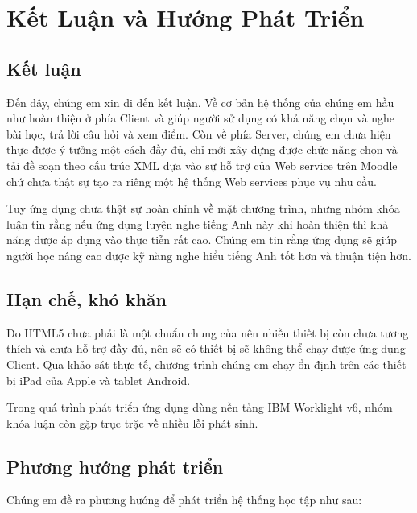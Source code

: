 \def\baselinestretch{1}
\chapter{Kết Luận và Hướng Phát Triển}
\ifpdf
    \graphicspath{{Conclusions/ConclusionsFigs/PNG/}{Conclusions/ConclusionsFigs/PDF/}{Conclusions/ConclusionsFigs/}}
\else
    \graphicspath{{Conclusions/ConclusionsFigs/EPS/}{Conclusions/ConclusionsFigs/}}
\fi

\def\baselinestretch{1.66}
 

\section{Kết luận}

Đến đây, chúng em xin đi đến kết luận. Về cơ bản hệ thống của chúng em hầu như hoàn thiện ở phía Client và giúp người sử dụng có khả năng chọn và nghe bài học, trả lời câu hỏi và xem điểm. Còn về phía Server, chúng em chưa hiện thực được ý tưởng một cách đầy đủ, chỉ mới xây dựng được chức năng chọn và tải đề soạn theo cấu trúc XML dựa vào sự hỗ trợ của Web service trên Moodle chứ chưa thật sự tạo ra riêng một hệ thống Web services phục vụ nhu cầu.

Tuy ứng dụng chưa thật sự hoàn chỉnh về mặt chương trình, nhưng nhóm khóa luận tin rằng nếu ứng dụng luyện nghe tiếng Anh này khi hoàn thiện thì khả năng được áp dụng vào thực tiễn rất cao. Chúng em tin rằng ứng dụng sẽ giúp người học nâng cao được kỹ năng nghe hiểu tiếng Anh tốt hơn và thuận tiện hơn.
 
\section{Hạn chế, khó khăn}

Do HTML5 chưa phải là một chuẩn chung của nên nhiều thiết bị còn chưa tương thích và chưa hỗ trợ đầy đủ, nên sẽ có thiết bị sẽ không thể chạy được ứng dụng Client. Qua khảo sát thực tế, chương trình chúng em chạy ổn định trên các thiết bị iPad của Apple và tablet Android.

Trong quá trình phát triển ứng dụng dùng nền tảng IBM Worklight v6, nhóm khóa luận còn gặp trục trặc về nhiều lỗi phát sinh.

\section{Phương hướng phát triển}

Chúng em đề ra phương hướng để phát triển hệ thống học tập như sau:

